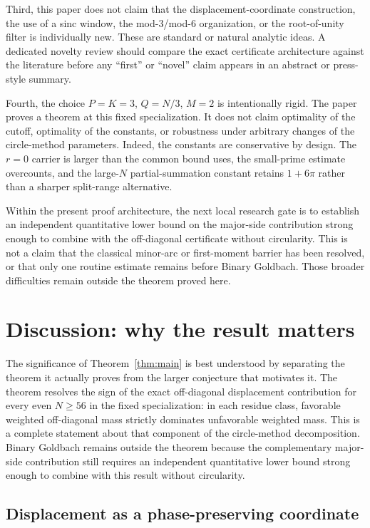 \documentclass[11pt]{article}
\theoremstyle{definition}
\begin{document}
Third, this paper does not claim that the displacement-coordinate construction, the use of a sinc window, the mod-$3$/mod-$6$ organization, or the root-of-unity filter is individually new. These are standard or natural analytic ideas. A dedicated novelty review should compare the exact certificate architecture against the literature before any ``first'' or ``novel'' claim appears in an abstract or press-style summary.

Fourth, the choice $P=K=3$, $Q=N/3$, $M=2$ is intentionally rigid. The paper proves a theorem at this fixed specialization. It does not claim optimality of the cutoff, optimality of the constants, or robustness under arbitrary changes of the circle-method parameters. Indeed, the constants are conservative by design. The $r=0$ carrier is larger than the common bound uses, the small-prime estimate overcounts, and the large-$N$ partial-summation constant retains $1+6\pi$ rather than a sharper split-range alternative.

Within the present proof architecture, the next local research gate is to establish an independent quantitative lower bound on the major-side contribution strong enough to combine with the off-diagonal certificate without circularity. This is not a claim that the classical minor-arc or first-moment barrier has been resolved, or that only one routine estimate remains before Binary Goldbach. Those broader difficulties remain outside the theorem proved here.

\section{Discussion: why the result matters}\label{sec:discussion}

The significance of Theorem~\ref{thm:main} is best understood by separating the theorem it actually proves from the larger conjecture that motivates it. The theorem resolves the sign of the exact off-diagonal displacement contribution for every even $N\ge56$ in the fixed specialization: in each residue class, favorable weighted off-diagonal mass strictly dominates unfavorable weighted mass. This is a complete statement about that component of the circle-method decomposition. Binary Goldbach remains outside the theorem because the complementary major-side contribution still requires an independent quantitative lower bound strong enough to combine with this result without circularity.

\subsection{Displacement as a phase-preserving coordinate}
\end{document}
